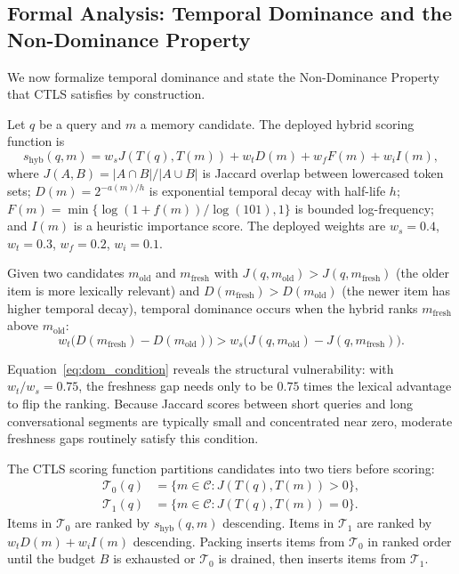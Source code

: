 \FloatBarrier

\subsection{Formal Analysis: Temporal Dominance and the Non-Dominance Property}
\label{sec:method_formal}

We now formalize temporal dominance and state the Non-Dominance Property that CTLS satisfies by construction.

\begin{definition}
Let $q$ be a query and $m$ a memory candidate. The deployed hybrid scoring function is
\begin{equation}
  s_{\mathrm{hyb}}(q,m) = w_s J(T(q),T(m)) + w_t D(m) + w_f F(m) + w_i I(m),
  \label{eq:hybrid}
\end{equation}
where $J(A,B)=|A\cap B|/|A\cup B|$ is Jaccard overlap between lowercased token sets; $D(m)=2^{-a(m)/h}$ is exponential temporal decay with half-life $h$; $F(m)=\min\{\log(1+f(m))/\log(101),1\}$ is bounded log-frequency; and $I(m)$ is a heuristic importance score. The deployed weights are $w_s=0.4$, $w_t=0.3$, $w_f=0.2$, $w_i=0.1$.
\end{definition}

\begin{definition}
Given two candidates $m_{\mathrm{old}}$ and $m_{\mathrm{fresh}}$ with $J(q,m_{\mathrm{old}}) > J(q,m_{\mathrm{fresh}})$ (the older item is more lexically relevant) and $D(m_{\mathrm{fresh}}) > D(m_{\mathrm{old}})$ (the newer item has higher temporal decay), temporal dominance occurs when the hybrid ranks $m_{\mathrm{fresh}}$ above $m_{\mathrm{old}}$:
\begin{equation}
  w_t\bigl(D(m_{\mathrm{fresh}})-D(m_{\mathrm{old}})\bigr) > w_s\bigl(J(q,m_{\mathrm{old}})-J(q,m_{\mathrm{fresh}})\bigr).
  \label{eq:dom_condition}
\end{equation}
\end{definition}

Equation~\ref{eq:dom_condition} reveals the structural vulnerability: with $w_t/w_s = 0.75$, the freshness gap needs only to be $0.75$ times the lexical advantage to flip the ranking. Because Jaccard scores between short queries and long conversational segments are typically small and concentrated near zero, moderate freshness gaps routinely satisfy this condition.

\begin{definition}
The CTLS scoring function partitions candidates into two tiers before scoring:
\begin{align}
  \mathcal{T}_0(q) &= \{m \in \mathcal{C} : J(T(q),T(m)) > 0\}, \label{eq:tier0} \\
  \mathcal{T}_1(q) &= \{m \in \mathcal{C} : J(T(q),T(m)) = 0\}. \label{eq:tier1}
\end{align}
Items in $\mathcal{T}_0$ are ranked by $s_{\mathrm{hyb}}(q,m)$ descending. Items in $\mathcal{T}_1$ are ranked by $w_t D(m) + w_i I(m)$ descending. Packing inserts items from $\mathcal{T}_0$ in ranked order until the budget $B$ is exhausted or $\mathcal{T}_0$ is drained, then inserts items from $\mathcal{T}_1$.
\end{definition}

